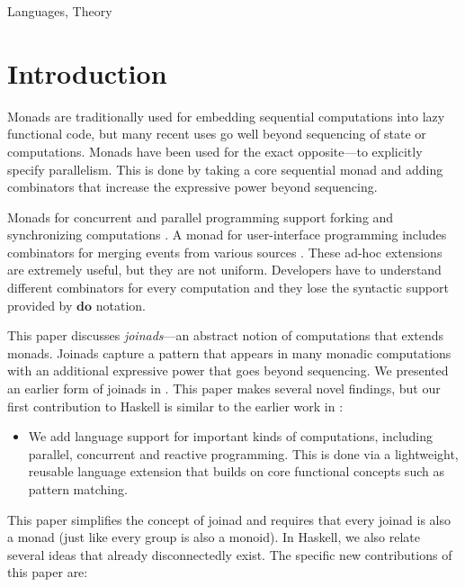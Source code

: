 \documentclass{sigplanconf}
\begin{document}

\terms
Languages, Theory



\section{Introduction}
Monads are traditionally used for embedding sequential computations into lazy functional code, 
but many recent uses go well beyond sequencing of state or computations. Monads have been used for 
the exact opposite---to explicitly specify parallelism. This is done by taking a core sequential 
monad and adding combinators that increase the expressive power beyond sequencing.

Monads for concurrent \cite{poorman} and parallel programming \cite{parmonad} support forking 
and synchronizing computations \cite{chp-monad}. A monad for user-interface programming 
includes combinators for merging events from various sources \cite{imperative-streams}. These 
ad-hoc extensions are extremely useful, but they are not uniform. Developers have to understand 
different combinators for every computation and they lose the syntactic support provided by \ensuremath{\mathbf{do}} notation.

This paper discusses \textit{joinads}---an abstract notion of computations that extends monads.
Joinads capture a pattern that appears in many monadic computations with an additional expressive 
power that goes beyond sequencing. We presented an earlier form of joinads in \fsharp \cite{joinads}. 
This paper makes several novel findings, but our first contribution to Haskell is similar to the 
earlier work in \fsharp:

\begin{itemize}
\item  We add language support for important kinds of computations, including 
  parallel, concurrent and reactive programming. This is done via a lightweight, reusable language 
  extension that builds on core functional concepts such as pattern matching.

\end{itemize}
This paper simplifies the concept of joinad and requires that every joinad is also a monad (just like
every group is also a monoid). In Haskell, we also relate several ideas that already disconnectedly 
exist. The specific new contributions of this paper are:
\end{document}
